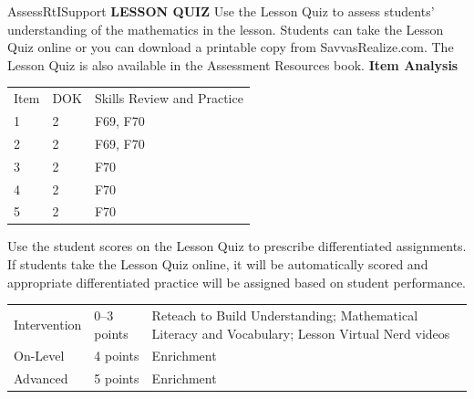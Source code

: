 \documentclass{article}
\newenvironment{te-addendum}[2]{}{}     %
\begin{document}
\begin{te-addendum}{Assess}{RtISupport}
\textbf{LESSON QUIZ}
Use the Lesson Quiz to assess students' understanding of the mathematics in the lesson.
Students can take the Lesson Quiz online or you can download a printable copy from SavvasRealize.com. The Lesson Quiz is also available in the Assessment Resources book.
\textbf{Item Analysis}
\begin{tabular}{lll}
Item & DOK & Skills Review and Practice \\
1 & 2 & F69, F70 \\
2 & 2 & F69, F70 \\
3 & 2 & F70 \\
4 & 2 & F70 \\
5 & 2 & F70 \\
\end{tabular}
Use the student scores on the Lesson Quiz to prescribe differentiated assignments.
If students take the Lesson Quiz online, it will be automatically scored and appropriate differentiated practice will be assigned based on student performance.
\begin{tabular}{lll}
Intervention & 0--3 points & Reteach to Build Understanding; Mathematical Literacy and Vocabulary; Lesson Virtual Nerd videos \\
On-Level & 4 points & Enrichment \\
Advanced & 5 points & Enrichment \\
\end{tabular}
\end{te-addendum}
\end{document}
